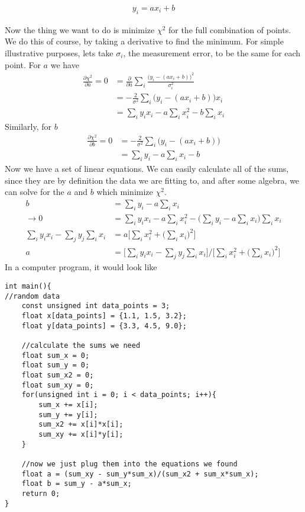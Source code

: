 \begin{align}
y_i = ax_i + b
\end{align}

Now the thing we want to do is minimize $\chi^2$ for the full combination of points. We do this of course, by taking a derivative to find the minimum. For simple illustrative purposes, lets take $\sigma_i$, the measurement error, to be the same for each point. For $a$ we have
\begin{align}
\frac{\partial \chi^2}{\partial a} = 0 &= \frac{\partial}{\partial a} \sum_i \frac{\Big(y_i - (ax_i + b)\Big)^2}{\sigma_i^2} \\
&= - \frac{2}{\sigma^2}\sum_i \Big(y_i - (ax_i+b)\Big)x_i\\
&= \sum_i y_i x_i - a\sum_ix_i^2 - b\sum_i x_i
\end{align}
Similarly, for $b$
\begin{align}
\frac{\partial \chi^2}{\partial b} = 0 &= -\frac{2}{\sigma^2}\sum_i \Big(y_i-(ax_i+b)\Big)\\
&= \sum_i y_i - a \sum_i x_i - b
\end{align}
Now we have a set of linear equations. We can easily calculate all of the sums, since they are by definition the data we are fitting to, and after some algebra, we can solve for the $a$ and $b$ which minimize $\chi^2$.
\begin{align}
b &= \sum_i y_i - a \sum_i x_i\\
\rightarrow 0 &= \sum_i y_i x_i - a\sum_ix_i^2 - \Big(\sum_i y_i - a \sum_i x_i\Big)\sum_i x_i\\
\sum_i y_i x_i  - \sum_j y_j \sum_i x_i &= a\Big[\sum_i x_i^2 +\Big(\sum_i x_i\Big)^2\Big]\\
a &= \Big[\sum_i y_i x_i  - \sum_j y_j \sum_i x_i\Big] /\Big[\sum_i x_i^2 +\Big(\sum_i x_i\Big)^2\Big] 
\end{align}
In a computer program, it would look like
\begin{verbatim}
int main(){
//random data
    const unsigned int data_points = 3;
    float x[data_points] = {1.1, 1.5, 3.2};
    float y[data_points] = {3.3, 4.5, 9.0};
    
    //calculate the sums we need
    float sum_x = 0;
    float sum_y = 0;
    float sum_x2 = 0;
    float sum_xy = 0;
    for(unsigned int i = 0; i < data_points; i++){
        sum_x += x[i];
        sum_y += y[i];
        sum_x2 += x[i]*x[i];
        sum_xy += x[i]*y[i];
    }
    
    //now we just plug them into the equations we found
    float a = (sum_xy - sum_y*sum_x)/(sum_x2 + sum_x*sum_x);
    float b = sum_y - a*sum_x;
    return 0;
}
\end{verbatim}

